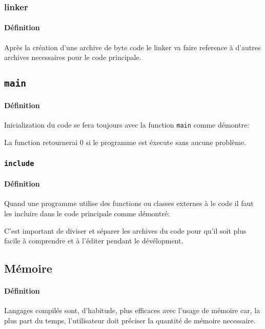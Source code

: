\documentclass{article}
\begin{document}
\subsubsection{linker}
\paragraph{Définition}Après la création d'une archive de byte code le linker va faire reference à d'autres archives necessaires pour le code principale.

\subsection{\texttt{main}}
\paragraph{Définition}Inicialization du code se fera toujours avec la function \texttt{main} comme démontre:
\begin{scriptsize}
    \mycode
\end{scriptsize}
La function retournerai 0 si le programme est éxecute sans aucune problème.

\subsubsection{\texttt{include}}
\paragraph{Définition}Quand une programme utilise des functions ou classes externes à le code il faut les incluire dans le code principale comme démontré:
\begin{scriptsize}
    \mycode
\end{scriptsize}
C'est important de diviser et séparer les archives du code pour qu'il soit plus facile à comprendre et à l'éditer pendant le dévélopment.

\subsection{Mémoire}
\paragraph{Définition}Langages compilés sont, d'habitude, plus efficaces avec l'usage de mémoire car, la plus part du temps, l'utilisateur doit préciser la quantité de mémoire necessaire.
\end{document}
